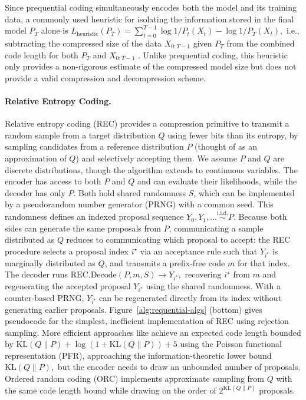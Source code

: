 \documentclass{article}
\theoremstyle{plain}
\theoremstyle{definition}
\theoremstyle{remark}
\begin{document}
Since prequential coding simultaneously encodes both the model and its training data, a commonly used heuristic for isolating the information stored in the final model $P_T$ alone is $L_{\mathrm{heuristic}}(P_T)=\sum_{t=0}^{T-1}\log 1/P_t(X_t) - \log 1/P_T(X_t),$ i.e., subtracting the compressed size of the data $X_{0:T-1}$ given $P_T$ from the combined code length for both $P_T$ and $X_{0:T-1}$ \citep{blier2018description,feldman1998information,whitney2020evaluating,zhang2020measuring,finzi2025compute,finzi2026entropy}. Unlike prequential coding, this heuristic only provides a non-rigorous estimate of the compressed model size but does not provide a valid compression and decompression scheme.


\paragraph{Relative Entropy Coding.}\label{sec:rec}
Relative entropy coding (REC) \citep{flamich2020compressing,theis2022algorithms} provides a compression primitive to transmit a random sample from a target distribution $Q$ using fewer bits than its entropy, by sampling candidates from a reference distribution $P$ (thought of as an approximation of $Q$) and selectively accepting them. We assume $P$ and $Q$ are discrete distributions, though the algorithm extends to continuous variables.  The encoder has access to both $P$ and $Q$ and can evaluate their likelihoods, while the decoder has only $P$. Both hold shared randomness $S$, which can be implemented by a pseudorandom number generator (PRNG) with a common seed. This randomness defines an indexed proposal sequence $Y_0,Y_1,\ldots \overset{\mathrm{i.i.d.}}{\sim} P.$ Because both sides can generate the same proposals from $P$, communicating a sample distributed as $Q$ reduces to communicating which proposal to accept: the REC procedure selects a proposal index $i^\star$ via an acceptance rule such that $Y_{i^\star}$ is marginally distributed as $Q$, and transmits a prefix-free code $m$ for that index. The decoder runs $\mathrm{REC.Decode}(P, m, S) \to Y_{i^\star},$ recovering $i^\star$ from $m$ and regenerating the accepted proposal $Y_{i^\star}$ using the shared randomness.  With a counter-based PRNG, $Y_{i^\star}$ can be regenerated directly from its index without generating earlier proposals. Figure~\ref{alg:requential-algs} (bottom) gives pseudocode for the simplest, inefficient implementation of REC using rejection sampling. More efficient approaches like \citet{li2018strong} achieve an expected code length bounded by $\mathrm{KL}(Q\|P) + \log(1+\mathrm{KL}(Q\|P)) + 5$ using the Poisson functional representation (PFR), approaching the information-theoretic lower bound $\mathrm{KL}(Q\|P),$ but the encoder needs to draw an unbounded number of proposals. Ordered random coding (ORC) \citep{theis2022algorithms} implements approximate sampling from $Q$ with the same code length bound while drawing on the order of $2^{\mathrm{KL}(Q\|P)}$ proposals.
%
\end{document}
